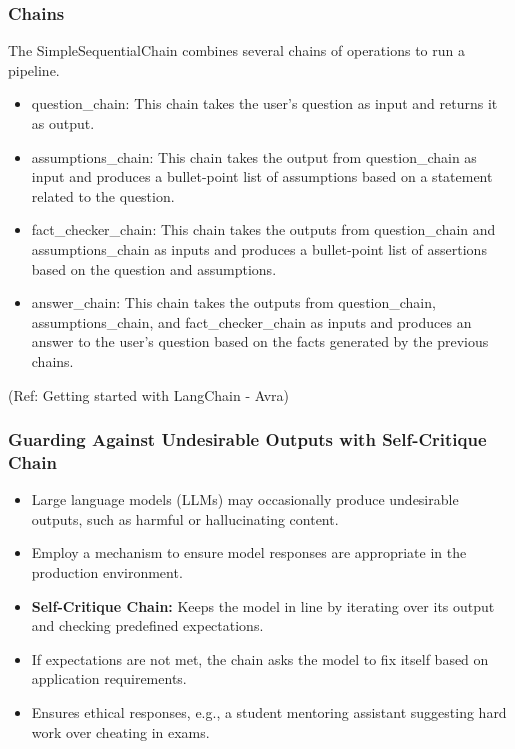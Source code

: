 \begin{frame}\frametitle{Chains}

The SimpleSequentialChain combines several chains of operations to run a pipeline. 

\begin{itemize}
\item question\_chain: This chain takes the user's question as input and returns it as output. 
\item assumptions\_chain: This chain takes the output from question\_chain as input and produces a bullet-point list of assumptions based on a statement related to the question. 
\item fact\_checker\_chain: This chain takes the outputs from question\_chain and assumptions\_chain as inputs and produces a bullet-point list of assertions based on the question and assumptions.
\item answer\_chain: This chain takes the outputs from question\_chain, assumptions\_chain, and fact\_checker\_chain as inputs and produces an answer to the user's question based on the facts generated by the previous chains.
\end{itemize}


{\tiny (Ref: Getting started with LangChain - Avra)}
\end{frame}

\begin{frame}
\frametitle{Guarding Against Undesirable Outputs with Self-Critique Chain}

\begin{itemize}
    \item Large language models (LLMs) may occasionally produce undesirable outputs, such as harmful or hallucinating content.
    \item Employ a mechanism to ensure model responses are appropriate in the production environment.
    \item \textbf{Self-Critique Chain:} Keeps the model in line by iterating over its output and checking predefined expectations.
    \item If expectations are not met, the chain asks the model to fix itself based on application requirements.
    \item Ensures ethical responses, e.g., a student mentoring assistant suggesting hard work over cheating in exams.
\end{itemize}

\end{frame}

